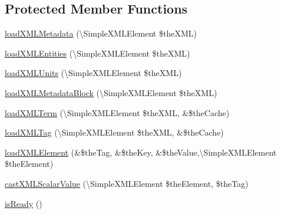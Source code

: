\subsection*{Protected Member Functions}
\begin{DoxyCompactItemize}
\item 
\hyperlink{class_ontology_wrapper_1_1_wrapper_aa8b5ac231784ffcda74ea463c6e92cc1}{load\-X\-M\-L\-Metadata} (\textbackslash{}Simple\-X\-M\-L\-Element \$the\-X\-M\-L)
\item 
\hyperlink{class_ontology_wrapper_1_1_wrapper_adbb3bf1090ccdf7ed89ffd494a0b101c}{load\-X\-M\-L\-Entities} (\textbackslash{}Simple\-X\-M\-L\-Element \$the\-X\-M\-L)
\item 
\hyperlink{class_ontology_wrapper_1_1_wrapper_aaad33b2f3f398545a234f7650f126321}{load\-X\-M\-L\-Units} (\textbackslash{}Simple\-X\-M\-L\-Element \$the\-X\-M\-L)
\item 
\hyperlink{class_ontology_wrapper_1_1_wrapper_a3500af2ce8421aed6b1f6dcfb5112546}{load\-X\-M\-L\-Metadata\-Block} (\textbackslash{}Simple\-X\-M\-L\-Element \$the\-X\-M\-L)
\item 
\hyperlink{class_ontology_wrapper_1_1_wrapper_a8ccba167a921ff4661910c0b9f1d0a7c}{load\-X\-M\-L\-Term} (\textbackslash{}Simple\-X\-M\-L\-Element \$the\-X\-M\-L, \&\$the\-Cache)
\item 
\hyperlink{class_ontology_wrapper_1_1_wrapper_a68e6a836e7e1d9d6f6da7bc191582a6c}{load\-X\-M\-L\-Tag} (\textbackslash{}Simple\-X\-M\-L\-Element \$the\-X\-M\-L, \&\$the\-Cache)
\item 
\hyperlink{class_ontology_wrapper_1_1_wrapper_ae5261a315a52ff325df36f277f6aba93}{load\-X\-M\-L\-Element} (\&\$the\-Tag, \&\$the\-Key, \&\$the\-Value,\textbackslash{}Simple\-X\-M\-L\-Element \$the\-Element)
\item 
\hyperlink{class_ontology_wrapper_1_1_wrapper_a4c35be252b6d9796bee31809bdd35298}{cast\-X\-M\-L\-Scalar\-Value} (\textbackslash{}Simple\-X\-M\-L\-Element \$the\-Element, \$the\-Tag)
\item 
\hyperlink{class_ontology_wrapper_1_1_wrapper_a7ae448c40693559ee0bd7898fe041fc1}{is\-Ready} ()
\end{DoxyCompactItemize}
